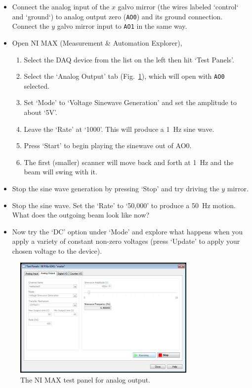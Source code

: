 \documentclass[a4paper]{report}
\begin{document}
\begin{itemize}
    \item Connect the analog input of the $x$ galvo mirror (the wires labeled `control` and `ground`) to analog output zero (\texttt{AO0}) and its ground connection.
    Connect the $y$ galvo mirror input to \texttt{AO1} in the same way. 
    \item Open NI MAX (Measurement \& Automation Explorer),
        \begin{enumerate}
            \setlength\itemsep{0.15em}
            \item Select the DAQ device from the list on the left then hit `Test Panels'. 
            \item Select the `Analog Output' tab (Fig.~\ref{DAQMX}), which will open with \texttt{AO0} selected.
            \item Set `Mode' to `Voltage Sinewave Generation' and set the amplitude to about `5V'.
            \item Leave the `Rate' at `1000'. This will produce a 1~Hz sine wave.
            \item Press `Start' to begin playing the sinewave out of AO0.
            \item The first (smaller) scanner will move back and forth at 1~Hz and the beam will swing with it.
        \end{enumerate}
    \item Stop the sine wave generation by pressing `Stop' and try driving the $y$ mirror.
    \item Stop the sine wave. Set the `Rate' to `50,000' to produce a 50~Hz motion. What does the outgoing beam look like now?
    \item Now try the `DC' option under `Mode' and explore what happens when you apply a variety of constant non-zero voltages (press `Update' to apply your chosen voltage to the device).
\end{itemize}


\begin{figure}[h]
\centering
\includegraphics[width=3.5in]{MAX_for_1D.png}
\caption{The NI MAX test panel for analog output.}
\label{DAQMX}
\end{figure}
\end{document}

